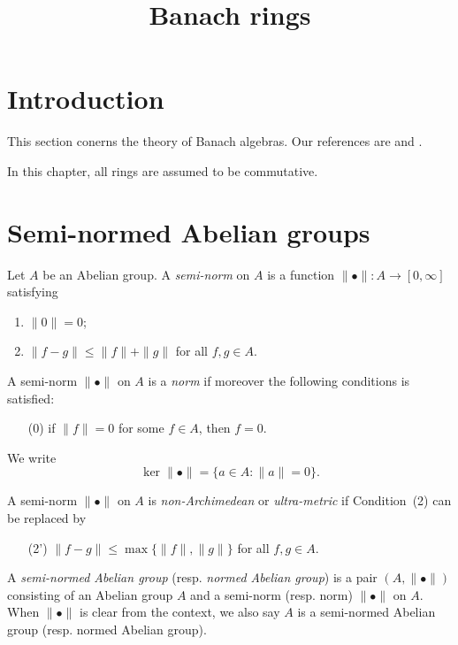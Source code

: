 
\title{Banach rings}

\maketitle
\tableofcontents



\section{Introduction}\label{sec-introduction}

This section conerns the theory of Banach algebras. Our references are \cite{Berk12} and \cite{BGR}.

In this chapter, all rings are assumed to be commutative.

\section{Semi-normed Abelian groups}

\begin{definition}
    Let $A$ be an Abelian group. A \emph{semi-norm} on $A$ is a function $\|\bullet\|:A\rightarrow [0,\infty]$ satisfying
    \begin{enumerate}
        \item $\|0\|=0$;
        \item $\|f-g\|\leq \|f\|+\|g\|$ for all $f,g\in A$.
    \end{enumerate}
    A semi-norm $\|\bullet\|$ on $A$ is a \emph{norm} if moreover the following conditions is satisfied:
    \begin{enumerate}
        \item[(0)] if $\|f\|=0$ for some $f\in A$, then $f=0$.
    \end{enumerate}
    We write
    \[
        \ker \|\bullet\|=\{a\in A:\|a\|=0\}.
    \]

    A semi-norm $\|\bullet\|$ on $A$ is \emph{non-Archimedean} or \emph{ultra-metric} if Condition~(2) can be replaced by
    \begin{enumerate}[resume]
        \item[(2')] $\|f-g\|\leq \max\{\|f\|,\|g\|\}$ for all $f,g\in A$.
    \end{enumerate}
\end{definition}
\begin{definition}
    A \emph{semi-normed Abelian group} (resp. \emph{normed Abelian group}) is a pair $(A,\|\bullet\|)$ consisting of an Abelian group $A$ and a semi-norm (resp. norm) $\|\bullet\|$ on $A$. When $\|\bullet\|$ is clear from the context, we also say $A$ is a semi-normed Abelian group (resp. normed Abelian group).
\end{definition}


